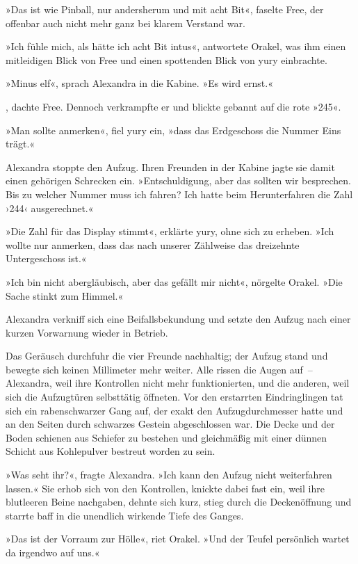 »Das ist wie Pinball, nur andersherum und mit acht Bit«, faselte Free, der offenbar auch nicht mehr ganz bei klarem Verstand war.

»Ich fühle mich, als hätte ich acht Bit intus«, antwortete Orakel, was ihm einen mitleidigen Blick von Free und einen spottenden Blick von yury einbrachte.

»Minus elf«, sprach Alexandra in die Kabine. »Es wird ernst.«

, dachte Free. Dennoch verkrampfte er und blickte gebannt auf die rote »245«.

»Man sollte anmerken«, fiel yury ein, »dass das Erdgeschoss die Nummer Eins trägt.«

Alexandra stoppte den Aufzug. Ihren Freunden in der Kabine jagte sie damit einen gehörigen Schrecken ein. »Entschuldigung, aber das sollten wir besprechen. Bis zu welcher Nummer muss ich fahren? Ich hatte beim Herunterfahren die Zahl ›244‹ ausgerechnet.«

»Die Zahl für das Display stimmt«, erklärte yury, ohne sich zu erheben. »Ich wollte nur anmerken, dass das nach unserer Zählweise das dreizehnte Untergeschoss ist.«

»Ich bin nicht abergläubisch, aber das gefällt mir nicht«, nörgelte Orakel. »Die Sache stinkt zum Himmel.«

Alexandra verkniff sich eine Beifallsbekundung und setzte den Aufzug nach einer kurzen Vorwarnung wieder in Betrieb.


Das Geräusch durchfuhr die vier Freunde nachhaltig; der Aufzug stand und bewegte sich keinen Millimeter mehr weiter. Alle rissen die Augen auf~– Alexandra, weil ihre Kontrollen nicht mehr funktionierten, und die anderen, weil sich die Aufzugtüren selbsttätig öffneten. Vor den erstarrten Eindringlingen tat sich ein rabenschwarzer Gang auf, der exakt den Aufzugdurchmesser hatte und an den Seiten durch schwarzes Gestein abgeschlossen war. Die Decke und der Boden schienen aus Schiefer zu bestehen und gleichmäßig mit einer dünnen Schicht aus Kohlepulver bestreut worden zu sein.

»Was seht ihr?«, fragte Alexandra. »Ich kann den Aufzug nicht weiterfahren lassen.« Sie erhob sich von den Kontrollen, knickte dabei fast ein, weil ihre blutleeren Beine nachgaben, dehnte sich kurz, stieg durch die Deckenöffnung und starrte baff in die unendlich wirkende Tiefe des Ganges.

»Das ist der Vorraum zur Hölle«, riet Orakel. »Und der Teufel persönlich wartet da irgendwo auf uns.«

